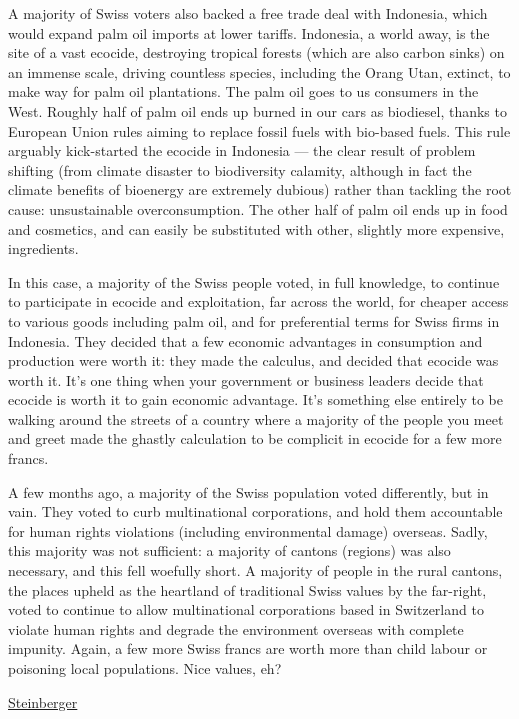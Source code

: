 \documentclass[
]{book}
\begin{document}
A majority of Swiss voters also backed a free trade deal with Indonesia, which would expand palm oil imports at lower tariffs. Indonesia, a world away, is the site of a vast ecocide, destroying tropical forests (which are also carbon sinks) on an immense scale, driving countless species, including the Orang Utan, extinct, to make way for palm oil plantations. The palm oil goes to us consumers in the West. Roughly half of palm oil ends up burned in our cars as biodiesel, thanks to European Union rules aiming to replace fossil fuels with bio-based fuels. This rule arguably kick-started the ecocide in Indonesia --- the clear result of problem shifting (from climate disaster to biodiversity calamity, although in fact the climate benefits of bioenergy are extremely dubious) rather than tackling the root cause: unsustainable overconsumption. The other half of palm oil ends up in food and cosmetics, and can easily be substituted with other, slightly more expensive, ingredients.

In this case, a majority of the Swiss people voted, in full knowledge, to continue to participate in ecocide and exploitation, far across the world, for cheaper access to various goods including palm oil, and for preferential terms for Swiss firms in Indonesia. They decided that a few economic advantages in consumption and production were worth it: they made the calculus, and decided that ecocide was worth it. It's one thing when your government or business leaders decide that ecocide is worth it to gain economic advantage. It's something else entirely to be walking around the streets of a country where a majority of the people you meet and greet made the ghastly calculation to be complicit in ecocide for a few more francs.

A few months ago, a majority of the Swiss population voted differently, but in vain. They voted to curb multinational corporations, and hold them accountable for human rights violations (including environmental damage) overseas. Sadly, this majority was not sufficient: a majority of cantons (regions) was also necessary, and this fell woefully short. A majority of people in the rural cantons, the places upheld as the heartland of traditional Swiss values by the far-right, voted to continue to allow multinational corporations based in Switzerland to violate human rights and degrade the environment overseas with complete impunity. Again, a few more Swiss francs are worth more than child labour or poisoning local populations. Nice values, eh?

\href{https://jksteinberger.medium.com/the-bear-the-tiger-and-the-trade-unionist-4b25df5fb3a9}{Steinberger}
\end{document}
